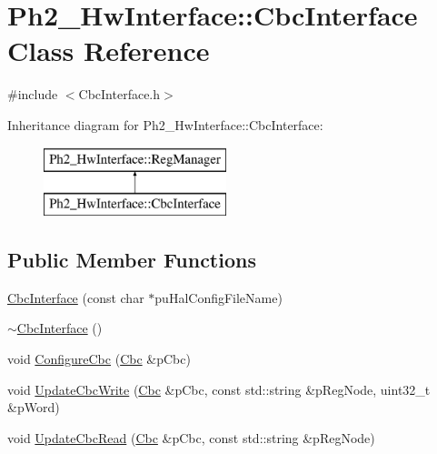 \hypertarget{class_ph2___hw_interface_1_1_cbc_interface}{\section{Ph2\-\_\-\-Hw\-Interface\-:\-:Cbc\-Interface Class Reference}
\label{class_ph2___hw_interface_1_1_cbc_interface}
}


{\ttfamily \#include $<$Cbc\-Interface.\-h$>$}

Inheritance diagram for Ph2\-\_\-\-Hw\-Interface\-:\-:Cbc\-Interface\-:\begin{figure}[H]
\begin{center}
\leavevmode
\includegraphics[height=2.000000cm]{class_ph2___hw_interface_1_1_cbc_interface}
\end{center}
\end{figure}
\subsection*{Public Member Functions}
\begin{DoxyCompactItemize}
\item 
\hyperlink{class_ph2___hw_interface_1_1_cbc_interface_a3ddefe5549da06a7d26fee1502a792b4}{Cbc\-Interface} (const char $\ast$pu\-Hal\-Config\-File\-Name)
\item 
\hyperlink{class_ph2___hw_interface_1_1_cbc_interface_a1f0ab7d7cf7783a0fe275e8e1d7e5a49}{$\sim$\-Cbc\-Interface} ()
\item 
void \hyperlink{class_ph2___hw_interface_1_1_cbc_interface_af5cf4eb5b7134835f00349cb19f35c56}{Configure\-Cbc} (\hyperlink{class_ph2___hw_description_1_1_cbc}{Cbc} \&p\-Cbc)
\item 
void \hyperlink{class_ph2___hw_interface_1_1_cbc_interface_a498d71b5709e0524b8e9dc50b92d1424}{Update\-Cbc\-Write} (\hyperlink{class_ph2___hw_description_1_1_cbc}{Cbc} \&p\-Cbc, const std\-::string \&p\-Reg\-Node, uint32\-\_\-t \&p\-Word)
\item 
void \hyperlink{class_ph2___hw_interface_1_1_cbc_interface_ab08ea1de98fe120098a4f5c52e017393}{Update\-Cbc\-Read} (\hyperlink{class_ph2___hw_description_1_1_cbc}{Cbc} \&p\-Cbc, const std\-::string \&p\-Reg\-Node)
\end{DoxyCompactItemize}
